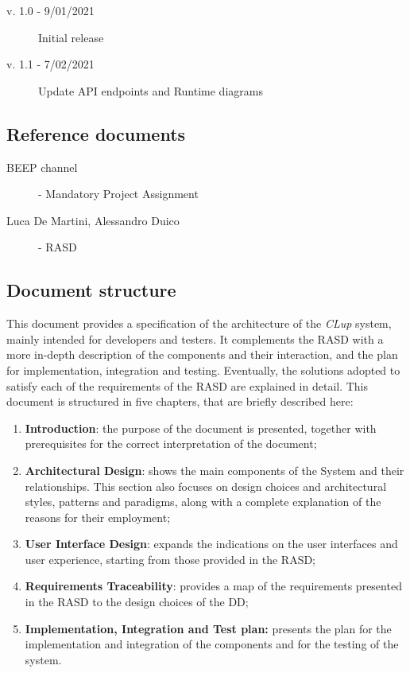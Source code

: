 \begin{description}
    \item[v. 1.0 - 9/01/2021] Initial release
    \item[v. 1.1 - 7/02/2021] Update API endpoints and Runtime diagrams
\end{description} 

\subsection{Reference documents}

\begin{description}
    \item [BEEP channel] - Mandatory Project Assignment
    \item [Luca De Martini, Alessandro Duico] - RASD
\end{description}


\subsection{Document structure}
This document provides a specification of the architecture of the \emph{CLup} system, mainly intended for developers and testers. 
It complements the RASD with a more in-depth description of the components and their interaction, and the plan for implementation, integration and testing. 
Eventually, the solutions adopted to satisfy each of the requirements of the RASD are explained in detail.
This document is structured in five chapters, that are briefly described here:
\begin{enumerate}
\item\textbf{Introduction}: the purpose of the document is presented, together with prerequisites for the correct interpretation of the document;
\item\textbf{Architectural Design}: shows the main components of the System and their relationships. This section also focuses on design choices and architectural styles, patterns and paradigms, along with a complete explanation of the reasons for their employment;
\item\textbf{User Interface Design}: expands the indications on the user interfaces and user experience, starting from those provided in the RASD;
\item\textbf{Requirements Traceability}: provides a map of the requirements presented in the RASD to the design choices of the DD;
\item\textbf{Implementation, Integration and Test plan:} presents the plan for the implementation and integration of the components and for the testing of the system.
\end{enumerate}

